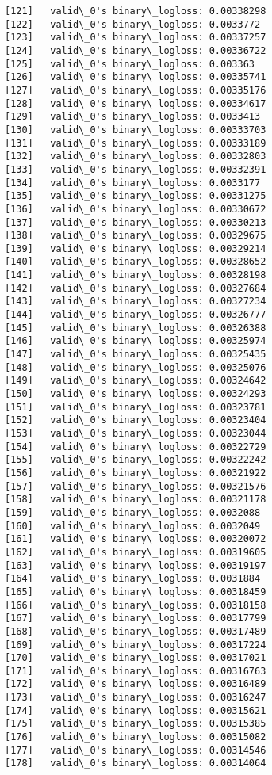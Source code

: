 \documentclass[11pt]{article}
\begin{document}
\begin{Verbatim}[commandchars=\\\{\}]
[121]	valid\_0's binary\_logloss: 0.00338298
[122]	valid\_0's binary\_logloss: 0.0033772
[123]	valid\_0's binary\_logloss: 0.00337257
[124]	valid\_0's binary\_logloss: 0.00336722
[125]	valid\_0's binary\_logloss: 0.003363
[126]	valid\_0's binary\_logloss: 0.00335741
[127]	valid\_0's binary\_logloss: 0.00335176
[128]	valid\_0's binary\_logloss: 0.00334617
[129]	valid\_0's binary\_logloss: 0.0033413
[130]	valid\_0's binary\_logloss: 0.00333703
[131]	valid\_0's binary\_logloss: 0.00333189
[132]	valid\_0's binary\_logloss: 0.00332803
[133]	valid\_0's binary\_logloss: 0.00332391
[134]	valid\_0's binary\_logloss: 0.0033177
[135]	valid\_0's binary\_logloss: 0.00331275
[136]	valid\_0's binary\_logloss: 0.00330672
[137]	valid\_0's binary\_logloss: 0.00330213
[138]	valid\_0's binary\_logloss: 0.00329675
[139]	valid\_0's binary\_logloss: 0.00329214
[140]	valid\_0's binary\_logloss: 0.00328652
[141]	valid\_0's binary\_logloss: 0.00328198
[142]	valid\_0's binary\_logloss: 0.00327684
[143]	valid\_0's binary\_logloss: 0.00327234
[144]	valid\_0's binary\_logloss: 0.00326777
[145]	valid\_0's binary\_logloss: 0.00326388
[146]	valid\_0's binary\_logloss: 0.00325974
[147]	valid\_0's binary\_logloss: 0.00325435
[148]	valid\_0's binary\_logloss: 0.00325076
[149]	valid\_0's binary\_logloss: 0.00324642
[150]	valid\_0's binary\_logloss: 0.00324293
[151]	valid\_0's binary\_logloss: 0.00323781
[152]	valid\_0's binary\_logloss: 0.00323404
[153]	valid\_0's binary\_logloss: 0.00323044
[154]	valid\_0's binary\_logloss: 0.00322729
[155]	valid\_0's binary\_logloss: 0.00322242
[156]	valid\_0's binary\_logloss: 0.00321922
[157]	valid\_0's binary\_logloss: 0.00321576
[158]	valid\_0's binary\_logloss: 0.00321178
[159]	valid\_0's binary\_logloss: 0.0032088
[160]	valid\_0's binary\_logloss: 0.0032049
[161]	valid\_0's binary\_logloss: 0.00320072
[162]	valid\_0's binary\_logloss: 0.00319605
[163]	valid\_0's binary\_logloss: 0.00319197
[164]	valid\_0's binary\_logloss: 0.0031884
[165]	valid\_0's binary\_logloss: 0.00318459
[166]	valid\_0's binary\_logloss: 0.00318158
[167]	valid\_0's binary\_logloss: 0.00317799
[168]	valid\_0's binary\_logloss: 0.00317489
[169]	valid\_0's binary\_logloss: 0.00317224
[170]	valid\_0's binary\_logloss: 0.00317021
[171]	valid\_0's binary\_logloss: 0.00316763
[172]	valid\_0's binary\_logloss: 0.00316489
[173]	valid\_0's binary\_logloss: 0.00316247
[174]	valid\_0's binary\_logloss: 0.00315621
[175]	valid\_0's binary\_logloss: 0.00315385
[176]	valid\_0's binary\_logloss: 0.00315082
[177]	valid\_0's binary\_logloss: 0.00314546
[178]	valid\_0's binary\_logloss: 0.00314064

\end{Verbatim}
\end{document}

